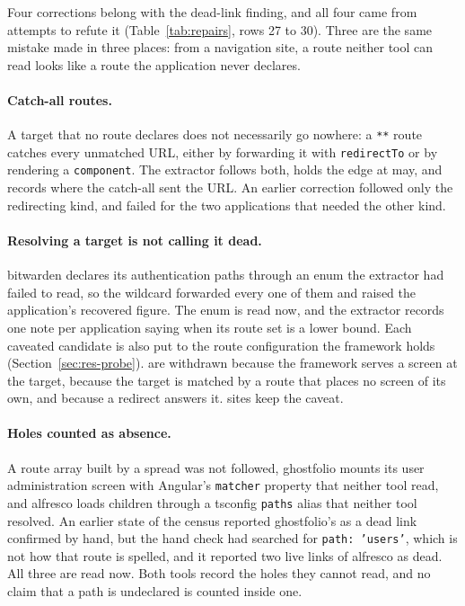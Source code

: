 Four corrections belong with the dead-link finding, and all four came from attempts to refute it (Table~\ref{tab:repairs}, rows 27 to 30). Three are the same mistake made in three places: from a navigation site, a route neither tool can read looks like a route the application never declares.

\paragraph{Catch-all routes.} A target that no route declares does not necessarily go nowhere: a \texttt{**} route catches every unmatched URL, either by forwarding it with \texttt{redirectTo} or by rendering a \texttt{component}. The extractor follows both, holds the edge at may, and records where the catch-all sent the URL. An earlier correction followed only the redirecting kind, and failed for the two applications that needed the other kind.

\paragraph{Resolving a target is not calling it dead.} bitwarden declares its authentication paths through an enum the extractor had failed to read, so the wildcard forwarded every one of them and raised the application's recovered figure. The enum is read now, and the extractor records one note per application saying when its route set is a lower bound. Each caveated candidate is also put to the route configuration the framework holds (Section~\ref{sec:res-probe}). \RoundTwoFrameworkMountsIt{} are withdrawn because the framework serves a screen at the target, \RoundTwoFrameworkPrefix{} because the target is matched by a route that places no screen of its own, and \RoundTwoFrameworkRedirects{} because a redirect answers it. \RoundTwoWildcardCaveated{} sites keep the caveat.

\paragraph{Holes counted as absence.} A route array built by a spread was not followed, ghostfolio mounts its user administration screen with Angular's \texttt{matcher} property that neither tool read, and alfresco loads children through a tsconfig \texttt{paths} alias that neither tool resolved. An earlier state of the census reported ghostfolio's  as a dead link confirmed by hand, but the hand check had searched for \texttt{path: 'users'}, which is not how that route is spelled, and it reported two live links of alfresco as dead. All three are read now. Both tools record the holes they cannot read, and no claim that a path is undeclared is counted inside one.

